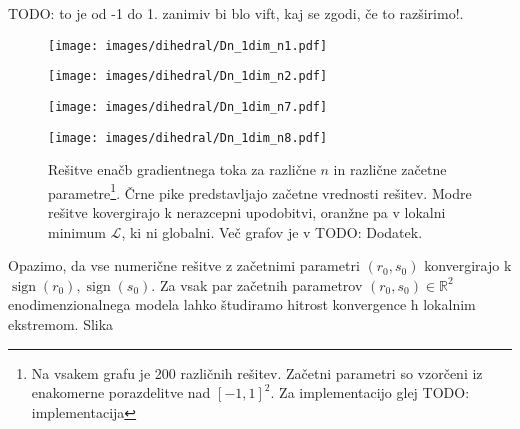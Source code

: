 \documentclass[mat2, tisk]{fmfdelo}
\newcommand{\TODO}[1]{{\color{blue} TODO: #1}}
\newcommand{\R}{\mathbb R}
\newcommand{\loss }{\mathcal L}
\begin{document}
        \TODO{to je od -1 do 1. zanimiv bi blo vift, kaj se zgodi, če to razširimo!}.
        \begin{figure}[h!]
            \centering
                        \begin{minipage}{0.49\textwidth}
                            \centering
                            \texttt{[image: images/dihedral/Dn\_1dim\_n1.pdf]}
                            \caption*{$n=1$}
                        \end{minipage} 
            \centering
                        \begin{minipage}{0.49\textwidth}
                            \centering
                            \texttt{[image: images/dihedral/Dn\_1dim\_n2.pdf]}
                            \caption*{$n=2$}
                        \end{minipage} 
            \vspace{0.5em}
            \centering
                        \begin{minipage}{0.49\textwidth}
                            \centering
                            \texttt{[image: images/dihedral/Dn\_1dim\_n7.pdf]}
                            \caption*{$n=7$}
                        \end{minipage} 
            \centering
                        \begin{minipage}{0.49\textwidth}
                            \centering
                            \texttt{[image: images/dihedral/Dn\_1dim\_n8.pdf]}
                            \caption*{$n=8$}
                        \end{minipage} 
            \caption[Rešitve enačb gradientnega toka za različne $n$ in različne začetne parametre. Črne pike predstavljajo začetne vrednosti rešitev. Modre rešitve kovergirajo k nerazcepni upodobitvi, oranžne pa v lokalni minimum $\loss$, ki ni globalni. 
Več grafov je v \TODO{Dodatek}.]{Rešitve enačb gradientnega toka za različne $n$ in različne začetne parametre\footnote{Na vsakem grafu je 200 različnih rešitev. Začetni parametri so vzorčeni iz enakomerne porazdelitve nad $[-1,1]^2$. Za implementacijo glej \TODO{implementacija}}. 
Črne pike predstavljajo začetne vrednosti rešitev. Modre rešitve kovergirajo k nerazcepni upodobitvi, oranžne pa v lokalni minimum $\loss$, ki ni globalni. 
Več grafov je v \TODO{Dodatek}.}
            \label{fig:Dn-trajektorije-demo}
        \end{figure}
% 
% 
% 
        Opazimo, da vse numerične rešitve z začetnimi parametri $(r_0, s_0)$ konvergirajo k $\operatorname{sign}(r_0), \operatorname{sign}(s_0)$. Za vsak par začetnih parametrov $(r_0, s_0) \in \R^2$ enodimenzionalnega modela lahko študiramo hitrost konvergence h lokalnim ekstremom. Slika 
\end{document}
